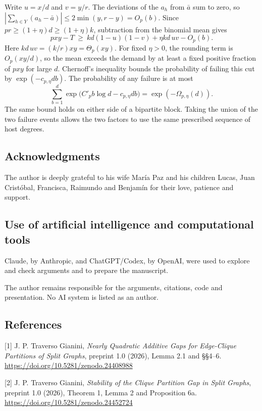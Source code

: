 \documentclass[english,11pt,a4paper]{article}
\begin{document}
Write \(u=x/d\) and \(v=y/r\). The deviations of the \(a_h\) from \(\bar a\) sum to zero, so \(|\sum_{h\in Y}(a_h-\bar a)|\le2\min(y,r-y)=O_p(b)\). Since \(pr\ge(1+\eta)d\ge(1+\eta)k\), subtraction from the binomial mean gives \[pxy-T\ \ge\ kd(1-u)(1-v)+\eta kd\,uv-O_p(b).\] Here \(kd\,uv=(k/r)xy=\Theta_p(xy)\). For fixed \(\eta>0\), the rounding term is \(O_p(xy/d)\), so the mean exceeds the demand by at least a fixed positive fraction of \(pxy\) for large \(d\). Chernoff's inequality bounds the probability of failing this cut by \(\exp(-c_{p,\eta}db)\). The probability of any failure is at most \[\sum_{b=1}^{d}\exp\big(C'_pb\log d-c_{p,\eta}db\big)
       =\exp(-\Omega_{p,\eta}(d)).\] The same bound holds on either side of a bipartite block. Taking the union of the two failure events allows the two factors to use the same prescribed sequence of host degrees.

\subsection{Acknowledgments}\label{acknowledgments}

The author is deeply grateful to his wife María Paz and his children Lucas, Juan Cristóbal, Francisca, Raimundo and Benjamín for their love, patience and support.

\subsection{Use of artificial intelligence and computational tools}\label{use-of-artificial-intelligence-and-computational-tools}

Claude, by Anthropic, and ChatGPT/Codex, by OpenAI, were used to explore and check arguments and to prepare the manuscript.

The author remains responsible for the arguments, citations, code and presentation. No AI system is listed as an author.

\subsection{References}\label{references}

{[}1{]} J. P. Traverso Gianini, \emph{Nearly Quadratic Additive Gaps for Edge-Clique Partitions of Split Graphs}, preprint 1.0 (2026), Lemma 2.1 and §§4--6. \url{https://doi.org/10.5281/zenodo.24408988}

{[}2{]} J. P. Traverso Gianini, \emph{Stability of the Clique Partition Gap in Split Graphs}, preprint 1.0 (2026), Theorem 1, Lemma 2 and Proposition 6a. \url{https://doi.org/10.5281/zenodo.24452724}
\end{document}
